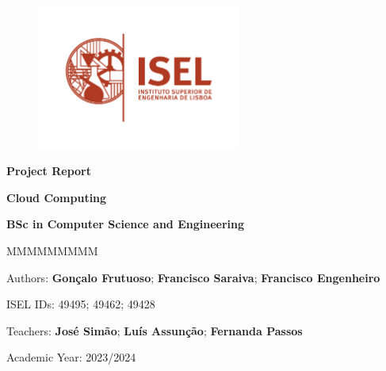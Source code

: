 \begin{figure}
    \centering
    \includegraphics[width=0.6\textwidth]{../figures/logo-isel}
    \label{fig:isel-logo}
\end{figure}

\begin{center}

    \vspace*{2cm} %

    \textbf{\Huge{}Project Report}

    \vspace{1cm}

    \textbf{\LARGE{}Cloud Computing}

    \textbf{\large{}BSc in Computer Science and Engineering}


    \vfill{} %

    \begin{lyxlist}{MMMMMMMMM}
        \begin{singlespace}
            \item [{Authors:}] \textbf{Gonçalo Frutuoso}; \textbf{Francisco Saraiva}; \textbf{Francisco Engenheiro}
            \item [{ISEL IDs:}] 49495; 49462; 49428
            \item [{Teachers:}] \textbf{José Simão}; \textbf{Luís Assunção}; \textbf{Fernanda Passos}
            \item [{Academic Year:}] 2023/2024
        \end{singlespace}
    \end{lyxlist}
\end{center}
